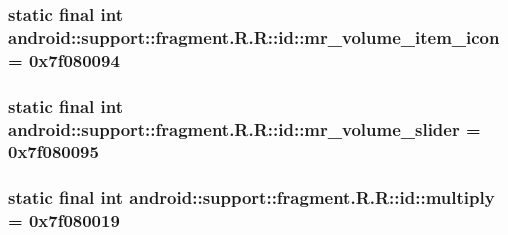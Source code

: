 \hypertarget{classandroid_1_1support_1_1fragment_1_1_r_1_1id_c46d33c02a346bfb907713f214acdf8a}{
\subsubsection[{mr\_\-volume\_\-item\_\-icon}]{\setlength{\rightskip}{0pt plus 5cm}static final int android::support::fragment.R.R::id::mr\_\-volume\_\-item\_\-icon = 0x7f080094}}
\label{classandroid_1_1support_1_1fragment_1_1_r_1_1id_c46d33c02a346bfb907713f214acdf8a}


\hypertarget{classandroid_1_1support_1_1fragment_1_1_r_1_1id_87b5b333ac7719d90e03d4c26c685c22}{
\subsubsection[{mr\_\-volume\_\-slider}]{\setlength{\rightskip}{0pt plus 5cm}static final int android::support::fragment.R.R::id::mr\_\-volume\_\-slider = 0x7f080095}}
\label{classandroid_1_1support_1_1fragment_1_1_r_1_1id_87b5b333ac7719d90e03d4c26c685c22}


\hypertarget{classandroid_1_1support_1_1fragment_1_1_r_1_1id_111b834a5ebed8dd30ac5bbbd9b87ccb}{
\subsubsection[{multiply}]{\setlength{\rightskip}{0pt plus 5cm}static final int android::support::fragment.R.R::id::multiply = 0x7f080019}}
\label{classandroid_1_1support_1_1fragment_1_1_r_1_1id_111b834a5ebed8dd30ac5bbbd9b87ccb}


